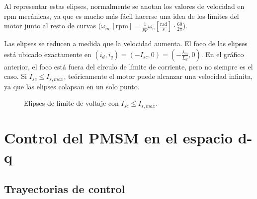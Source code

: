 Al representar estas elipses, normalmente se anotan los valores de velocidad en rpm mecánicas, ya que es mucho más fácil hacerse una idea de los límites del motor junto al resto de curvas (\(\omega_m \, [\text{rpm}] = \frac{1}{pp} \omega_e \left[\frac{\text{rad}}{s}\right] \cdot \frac{60}{2\pi}\)).

Las elipses se reducen a medida que la velocidad aumenta. El foco de las elipses está ubicado exactamente en \((i_d, i_q)=(-I_{sc}, 0) = \left(-\frac{\lambda_m}{L_d},0\right)\). En el gráfico anterior, el foco está fuera del círculo de límite de corriente, pero no siempre es el caso. Si \(I_{sc} \leq I_{s,max}\), teóricamente el motor puede alcanzar una velocidad infinita, ya que las elipses colapsan en un solo punto. 



\begin{figure}[H]
  \centering
  \caption{Elipses de límite de voltaje con $I_{sc} \leq I_{s,max}$.}
\end{figure}





\section{Control del PMSM en el espacio d-q}
\subsection{Trayectorias de control}

